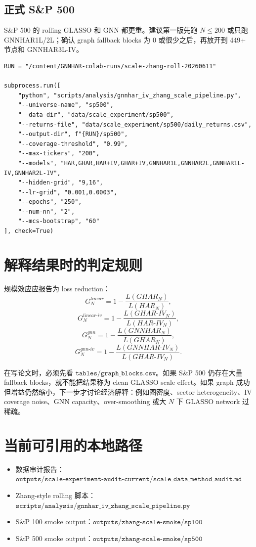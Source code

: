 \documentclass[11pt,a4paper]{ctexart}
\begin{document}
\subsection{正式 S\&P 500}

S\&P 500 的 rolling GLASSO 和 GNN 都更重。建议第一版先跑 \(N\leq 200\) 或只跑 GNNHAR1L/2L；确认 graph fallback blocks 为 0 或很少之后，再放开到 449+ 节点和 GNNHAR3L-IV。

\begin{lstlisting}
RUN = "/content/GNNHAR-colab-runs/scale-zhang-roll-20260611"

subprocess.run([
    "python", "scripts/analysis/gnnhar_iv_zhang_scale_pipeline.py",
    "--universe-name", "sp500",
    "--data-dir", "data/scale_experiment/sp500",
    "--returns-file", "data/scale_experiment/sp500/daily_returns.csv",
    "--output-dir", f"{RUN}/sp500",
    "--coverage-threshold", "0.99",
    "--max-tickers", "200",
    "--models", "HAR,GHAR,HAR+IV,GHAR+IV,GNNHAR1L,GNNHAR2L,GNNHAR1L-IV,GNNHAR2L-IV",
    "--hidden-grid", "9,16",
    "--lr-grid", "0.001,0.0003",
    "--epochs", "250",
    "--num-nn", "2",
    "--mcs-bootstrap", "60"
], check=True)
\end{lstlisting}

\section{解释结果时的判定规则}

规模效应应报告为 loss reduction：
\[
G^{linear}_N
=
1-\frac{L(GHAR_N)}{L(HAR_N)},
\]
\[
G^{linear\text{-}iv}_N
=
1-\frac{L(GHAR\text{-}IV_N)}{L(HAR\text{-}IV_N)},
\]
\[
G^{gnn}_N
=
1-\frac{L(GNNHAR_N)}{L(GHAR_N)},
\]
\[
G^{gnn\text{-}iv}_N
=
1-\frac{L(GNNHAR\text{-}IV_N)}{L(GHAR\text{-}IV_N)}.
\]

在写论文时，必须先看 \(\texttt{tables/graph\_blocks.csv}\)。如果 S\&P 500 仍存在大量 fallback blocks，就不能把结果称为 clean GLASSO scale effect。如果 graph 成功但增益仍然缩小，下一步才讨论经济解释：例如图密度、sector heterogeneity、IV coverage noise、GNN capacity、over-smoothing 或大 \(N\) 下 GLASSO network 过稀疏。

\section{当前可引用的本地路径}

\begin{itemize}[leftmargin=*]
\item 数据审计报告：\(\texttt{outputs/scale-experiment-audit-current/scale\_data\_method\_audit.md}\)
\item Zhang-style rolling 脚本：\(\texttt{scripts/analysis/gnnhar\_iv\_zhang\_scale\_pipeline.py}\)
\item S\&P 100 smoke output：\(\texttt{outputs/zhang-scale-smoke/sp100}\)
\item S\&P 500 smoke output：\(\texttt{outputs/zhang-scale-smoke/sp500}\)
\end{itemize}
\end{document}
